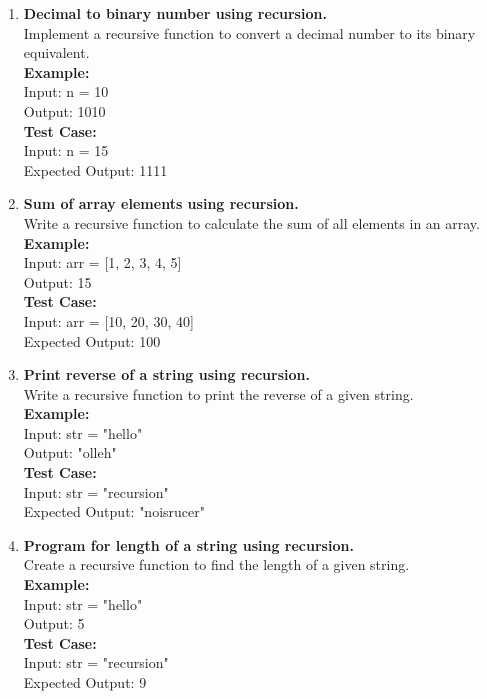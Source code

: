 \documentclass[12pt]{article}
\begin{document}
\begin{enumerate}
    \item \textbf{Decimal to binary number using recursion.} \\
    Implement a recursive function to convert a decimal number to its binary equivalent. \\
    \textbf{Example:} \\
    Input: n = 10 \\
    Output: 1010 \\
    \textbf{Test Case:} \\
    Input: n = 15 \\
    Expected Output: 1111
    
    \item \textbf{Sum of array elements using recursion.} \\
    Write a recursive function to calculate the sum of all elements in an array. \\
    \textbf{Example:} \\
    Input: arr = [1, 2, 3, 4, 5] \\
    Output: 15 \\
    \textbf{Test Case:} \\
    Input: arr = [10, 20, 30, 40] \\
    Expected Output: 100
    
    \item \textbf{Print reverse of a string using recursion.} \\
    Write a recursive function to print the reverse of a given string. \\
    \textbf{Example:} \\
    Input: str = "hello" \\
    Output: "olleh" \\
    \textbf{Test Case:} \\
    Input: str = "recursion" \\
    Expected Output: "noisrucer"
    
    \item \textbf{Program for length of a string using recursion.} \\
    Create a recursive function to find the length of a given string. \\
    \textbf{Example:} \\
    Input: str = "hello" \\
    Output: 5 \\
    \textbf{Test Case:} \\
    Input: str = "recursion" \\
    Expected Output: 9
    

\end{enumerate}
\end{document}
